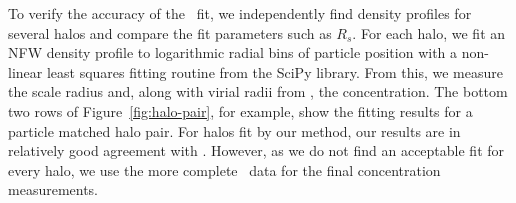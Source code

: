 To verify the accuracy of the \rockstar\ fit, we independently find density profiles for several halos and compare the fit parameters such as $R_{s}$.  For each halo, we fit an NFW density profile to logarithmic radial bins of particle position with a non-linear least squares fitting routine from the SciPy library.  From this, we measure the scale radius and, along with virial radii from \rockstar, the concentration.  The bottom two rows of Figure~\ref{fig:halo-pair}, for example, show the fitting results for a particle matched halo pair.  For halos fit by our method, our results are in relatively good agreement with \rockstar.  However, as we do not find an acceptable fit for every halo, we use the more complete \rockstar\ data for the final concentration measurements.

